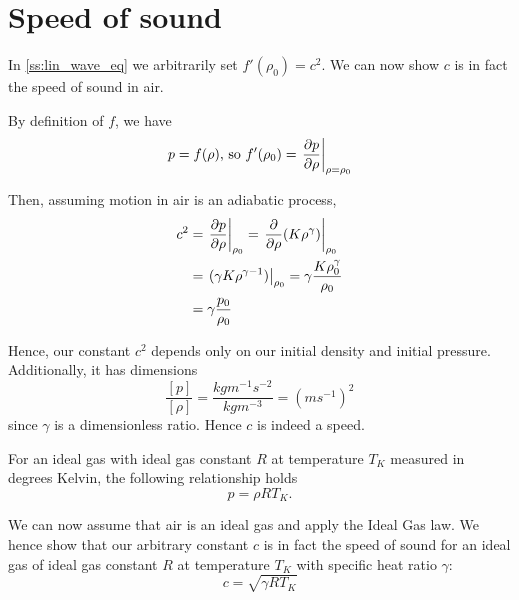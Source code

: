 \section{Speed of sound}\label{ss:speed_of_sound}
In \ref{ss:lin_wave_eq} we arbitrarily set $f'(\rho_0)=c^2$. We can now show $c$ is in fact the speed of sound in air. \par
%
By definition of $f$, we have
    \begin{equation}
         p = f(\rho) \text{, so } f'(\rho_0) = \left.\frac{\partial p}{\partial \rho} \right|_{\rho=\rho_0}
    \end{equation} \par
%
Then, assuming motion in air is an adiabatic process,
    \begin{align*}
        c^2 &= \left. \frac{\partial p}{\partial \rho} \right|_{\rho_0}
        = \left. \frac{\partial }{\partial \rho} (K \rho^\gamma) \right|_{\rho_0} \\
        &= \left. (\gamma K \rho^{\gamma-1}) \right|_{\rho_0}
        = \gamma \frac{K \rho_0 ^\gamma}{\rho_0} \\
        &= \gamma \frac{p_0}{\rho_0}
    \end{align*} \par
Hence, our constant $c^2$ depends only on our initial density and initial pressure. Additionally, it has dimensions 
    \begin{equation*}
        \frac{[p]}{[\rho]} = \frac{kgm^{-1}s^{-2}}{kgm^{-3}} = (ms^{-1})^2
    \end{equation*}
since $\gamma$ is a dimensionless ratio. Hence $c$ is indeed a speed. 
\begin{law}
    For an ideal gas with ideal gas constant $R$ at temperature $T_K$ measured in degrees Kelvin, the following relationship holds
        \begin{equation*} 
            p = \rho R T_K.
        \end{equation*}
    \end{law} \par
%
We can now assume that air is an ideal gas and apply the Ideal Gas law. We hence show that our arbitrary constant $c$ is in fact the speed of sound for an ideal gas of ideal gas constant $R$ at temperature $T_K$ with specific heat ratio $\gamma$:
    \begin{equation}
        c = \sqrt{\gamma R T_K}
    \end{equation}
%
